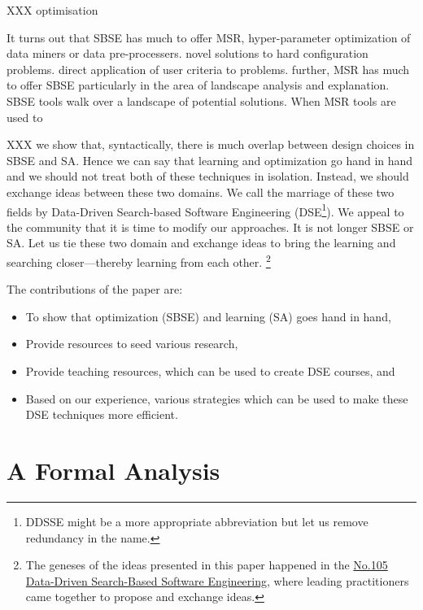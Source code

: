 \documentclass[table, xcdraw, sigconf,review, anonymous]{acmart}
\begin{document}
XXX optimisation

It turns out that SBSE has much to offer MSR, hyper-parameter optimization of data miners or data pre-processers. novel solutions to hard configuration problems. direct application of user criteria to problems. further, MSR has much to offer SBSE particularly in the area of landscape analysis and explanation. SBSE tools walk over a landscape of potential solutions. When MSR tools are used to 

XXX we show that,  syntactically, there is much overlap between design choices in SBSE and SA. Hence we can say that learning and optimization go hand in hand and we should not treat both of these techniques in isolation. Instead, we should exchange ideas between these two domains. We call the marriage of these two fields by Data-Driven Search-based Software Engineering (DSE\footnote{DDSSE might be a more appropriate abbreviation but let us remove redundancy in the name.}). We appeal to the community that it is time to modify our approaches. It is not longer SBSE or SA. Let us tie these two domain and exchange ideas to bring the learning and searching closer---thereby learning from each other. \footnote{The geneses of the ideas presented in this paper happened in the \href{http://shonan.nii.ac.jp/shonan/blog/2016/09/08/data-driven-search-based-software-engineering/}{No.105 Data-Driven Search-Based Software Engineering}, where leading practitioners came together to propose and exchange ideas.}  

The contributions of the paper are:
\begin{itemize}
    \item To show that optimization (SBSE) and learning (SA) goes hand in hand,
    \item Provide resources to seed various research,
    \item Provide teaching resources, which can be used to create DSE courses, and
    \item Based on our experience, various strategies which can be used to make these DSE techniques more efficient.
\end{itemize}


\section{A Formal Analysis}
\end{document}
